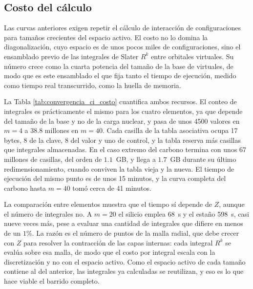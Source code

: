 \subsection{Costo del cálculo}

Las curvas anteriores exigen repetir el cálculo de interacción de configuraciones para tamaños crecientes del espacio activo. El costo no lo domina la diagonalización, cuyo espacio es de unos pocos miles de configuraciones, sino el ensamblado previo de las integrales de Slater $R^k$ entre orbitales virtuales. Su número crece como la cuarta potencia del tamaño de la base de virtuales, de modo que es este ensamblado el que fija tanto el tiempo de ejecución, medido como tiempo real transcurrido, como la huella de memoria.

\begin{table}[htbp]
    \centering
    \small
    
    \caption[Integrales $R^k$ y tiempo de ejecución del cálculo CI]{Número de integrales $R^k$ almacenadas en caché y tiempo de ejecución por tamaño del espacio activo, para los cuatro elementos de la secuencia. Los tiempos son incrementales: cada tamaño reutiliza las integrales calculadas para el anterior, salvo en el primer punto de cada curva y en las corridas reanudadas.}
    \label{tab:convergencia_ci_costo}
\end{table}

La Tabla \ref{tab:convergencia_ci_costo} cuantifica ambos recursos. El conteo de integrales es prácticamente el mismo para los cuatro elementos, ya que depende del tamaño de la base y no de la carga nuclear, y pasa de unos 4500 valores en $m=4$ a 38.8 millones en $m=40$. Cada casilla de la tabla asociativa ocupa 17 bytes, 8 de la clave, 8 del valor y uno de control, y la tabla reserva más casillas que integrales almacenadas. En el caso extremo del carbono termina con unos 67 millones de casillas, del orden de $1.1$~GB, y llega a $1.7$~GB durante su último redimensionamiento, cuando conviven la tabla vieja y la nueva. El tiempo de ejecución del mismo punto es de unos 15 minutos, y la curva completa del carbono hasta $m=40$ tomó cerca de 41 minutos.

La comparación entre elementos muestra que el tiempo sí depende de $Z$, aunque el número de integrales no. A $m=20$ el silicio emplea 68~s y el estaño 598~s, casi nueve veces más, pese a evaluar una cantidad de integrales que difiere en menos de un $1\%$. La razón es el número de puntos de la malla radial, que debe crecer con $Z$ para resolver la contracción de las capas internas: cada integral $R^k$ se evalúa sobre esa malla, de modo que el costo por integral escala con la discretización y no con el espacio activo. Como el espacio activo de cada tamaño contiene al del anterior, las integrales ya calculadas se reutilizan, y eso es lo que hace viable el barrido completo.

